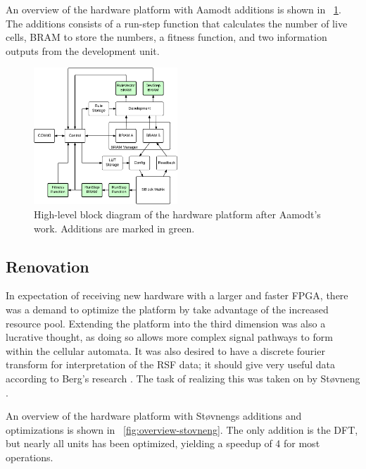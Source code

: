An overview of the hardware platform with Aamodt additions is shown in \figurename~\ref{fig:overview-aamodt}.
The additions consists of a run-step function that calculates the number of live cells, BRAM to store the numbers, a fitness function, and two information outputs from the development unit.

\begin{figure}[!ht]
    \centering
    \includegraphics[width=0.48\textwidth]{figures/overview-aamodt}
    \caption{High-level block diagram of the hardware platform after Aamodt's work. Additions are marked in green.}
    \label{fig:overview-aamodt}
\end{figure}



\subsection{Renovation}

In expectation of receiving new hardware with a larger and faster FPGA, there was a demand to optimize the platform by take advantage of the increased resource pool.
Extending the platform into the third dimension was also a lucrative thought, as doing so allows more complex signal pathways to form within the cellular automata.
It was also desired to have a discrete fourier transform for interpretation of the RSF data; it should give very useful data according to Berg's research \cite{berg2013ca}.
The task of realizing this was taken on by Støvneng \cite{stovneng2014sblock}.

An overview of the hardware platform with Støvnengs additions and optimizations is shown in \figurename~\ref{fig:overview-stovneng}.
The only addition is the DFT, but nearly all units has been optimized, yielding a speedup of 4 for most operations.

